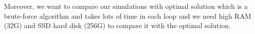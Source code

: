 \documentclass{article}
\begin{document}
Moreover, we want to compare our simulations with optimal solution which is a brute-force algorithm and takes lots of time in each loop and we need high RAM (32G) and SSD hard disk (256G) to compare it with the optimal solution.  
 




\vspace{20mm}
\end{document}
